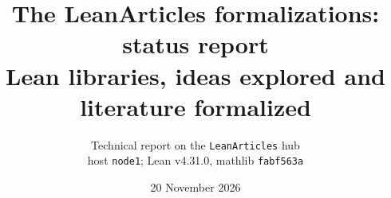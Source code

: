 

\usepackage{xcolor}
\newenvironment{leancode}{\VerbatimEnvironment\begin{Verbatim}[fontsize=\small,frame=single,framesep=2mm]}{\end{Verbatim}}
\newcommand{\unv}{\textsuperscript{\textcolor{red!60!black}{[r]}}}
\newcommand{\oq}[1]{OQ-#1}

\title{The LeanArticles formalizations: status report\\[2pt]
\large Lean libraries, ideas explored and literature formalized}
\author{Technical report on the \texttt{LeanArticles} hub\\
\small host \texttt{node1}; Lean v4.31.0, mathlib \texttt{fabf563a}}
\date{20 November 2026}


\maketitle

